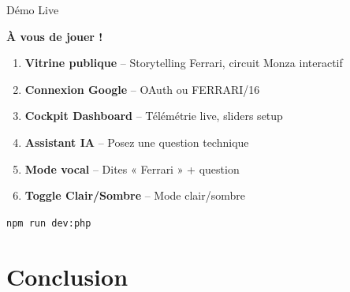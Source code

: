 \documentclass[11pt,aspectratio=169]{beamer}
\begin{document}
\begin{frame}{D\'emo Live}
  \begin{center}
    {\Large \textcolor{ferrariRed}{\textbf{\`A vous de jouer !}}}
  \end{center}

  \vspace{0.5cm}
  \begin{enumerate}
    \item \textbf{Vitrine publique} -- Storytelling Ferrari, circuit Monza interactif
    \item \textbf{Connexion Google} -- OAuth ou FERRARI/16
    \item \textbf{Cockpit Dashboard} -- T\'el\'em\'etrie live, sliders setup
    \item \textbf{Assistant IA} -- Posez une question technique
    \item \textbf{Mode vocal} -- Dites « Ferrari » + question
    \item \textbf{Toggle Clair/Sombre} -- Mode clair/sombre
  \end{enumerate}

  \vspace{0.5cm}
  \begin{center}
    \textcolor{ferrariRed}{\texttt{npm run dev:php}}
  \end{center}
\end{frame}

\section{Conclusion}
\end{document}
